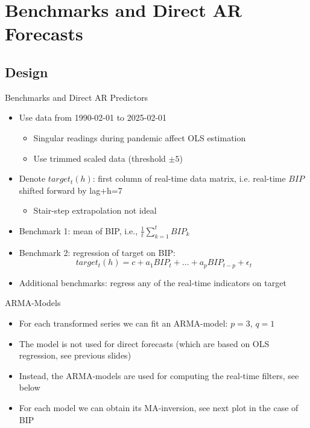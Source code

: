 \documentclass{beamer}
\begin{document}
\section{Benchmarks and Direct AR Forecasts}

\frame{\sectionpage}

\subsection{Design}

\begin{frame} {Benchmarks and Direct AR Predictors}
\begin{itemize}
\item Use data from 1990-02-01 to 2025-02-01 
\begin{itemize}
\item Singular readings during pandemic affect OLS estimation
\item Use trimmed scaled data (threshold $\pm 5$)
\end{itemize}

\item Denote $target_{t}(h)$: first column of real-time data matrix, i.e. real-time $BIP$ shifted forward by lag+h=7
\begin{itemize}
\item Stair-step extrapolation not ideal  
\end{itemize}
\item Benchmark 1: mean of BIP, i.e., $\frac{1}{t}\sum_{k=1}^t BIP_k$
\item Benchmark 2: regression of target on BIP:
\[target_{t}(h)=c+a_1 BIP_{t}+...+a_pBIP_{t-p}+\epsilon_t\]
\item Additional benchmarks: regress any of the real-time indicators on target 
\end{itemize}
\end{frame}





\begin{frame} {ARMA-Models}
\begin{itemize}
\item For each transformed series we can fit an ARMA-model: $p=3$, $q=1$
\item The model is not used for direct forecasts (which are based on OLS regression, see previous slides) 
\item Instead, the ARMA-models are used for computing the real-time filters, see below
\item For each model we can obtain its MA-inversion, see next plot in the case of BIP
\end{itemize}
\end{frame}
\end{document}
